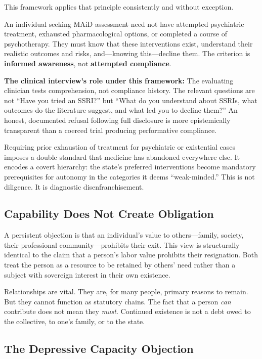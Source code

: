 \documentclass[11pt, letterpaper]{article}
\begin{document}
This framework applies that principle consistently and without exception.

An individual seeking MAiD assessment need not have attempted psychiatric treatment, exhausted
pharmacological options, or completed a course of psychotherapy. They must know that these
interventions exist, understand their realistic outcomes and risks, and---knowing this---decline
them. The criterion is \textbf{informed awareness}, not \textbf{attempted compliance}.

\begin{tcolorbox}[policybox]
\textbf{The clinical interview's role under this framework:} The evaluating clinician tests
comprehension, not compliance history. The relevant questions are not ``Have you tried an
SSRI?'' but ``What do you understand about SSRIs, what outcomes do the literature suggest,
and what led you to decline them?'' An honest, documented refusal following full disclosure
is more epistemically transparent than a coerced trial producing performative compliance.
\end{tcolorbox}

\medskip
Requiring prior exhaustion of treatment for psychiatric or existential cases imposes a double
standard that medicine has abandoned everywhere else. It encodes a covert hierarchy: the
state's preferred interventions become mandatory prerequisites for autonomy in the categories
it deems ``weak-minded.'' This is not diligence. It is diagnostic disenfranchisement.

\subsection{Capability Does Not Create Obligation}

A persistent objection is that an individual's value to others---family, society, their
professional community---prohibits their exit. This view is structurally identical to the
claim that a person's labor value prohibits their resignation. Both treat the person as a
resource to be retained by others' need rather than a subject with sovereign interest in
their own existence.

Relationships are vital. They are, for many people, primary reasons to remain. But they cannot
function as statutory chains. The fact that a person \textit{can} contribute does not mean
they \textit{must}. Continued existence is not a debt owed to the collective, to one's family,
or to the state.

\subsection{The Depressive Capacity Objection}
\end{document}
